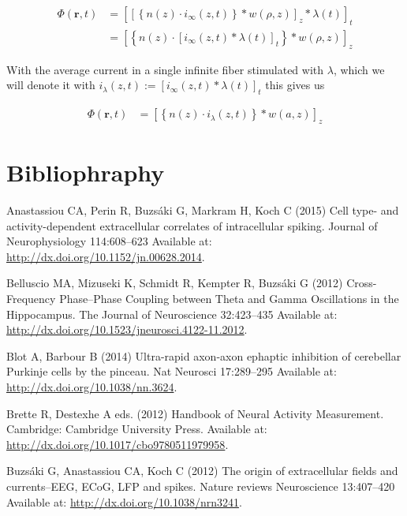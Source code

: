 \documentclass[]{article}
\begin{document}
\begin{align}
  \label{eqn:switchedpot}
  \Phi(\mathbf{r},t) & =  \left[\left[\left\{n(z)\cdot i_{\infty}(z,t)\right\}\ast w(\rho,z)\right]_z \ast \lambda(t)\right]_t \\
  & =  \left[\left\{n(z)\cdot \left[i_{\infty}(z,t)\ast \lambda(t)\right]_t\right\}\ast w(\rho,z)\right]_z
\end{align}

With the average current in a single infinite fiber stimulated with
\(\lambda\), which we will denote it with
\(i_\lambda(z,t) := \left[i_{\infty}(z,t)\ast \lambda(t)\right]_t\) this
gives us

\begin{align}
  \Phi(\mathbf{r},t) & =  \left[\left\{n(z)\cdot i_\lambda(z,t)\right\}\ast w(a,z)\right]_z
  \label{eqn:switchedpotend}
\end{align}

\section*{Bibliophraphy}\label{bibliophraphy}

\hypertarget{refs}{}
\hypertarget{ref-Anastassiou2015Cell}{}
Anastassiou CA, Perin R, Buzsáki G, Markram H, Koch C (2015) Cell type-
and activity-dependent extracellular correlates of intracellular
spiking. Journal of Neurophysiology 114:608--623 Available at:
\url{http://dx.doi.org/10.1152/jn.00628.2014}.

\hypertarget{ref-Belluscio2012CrossFrequency}{}
Belluscio MA, Mizuseki K, Schmidt R, Kempter R, Buzsáki G (2012)
Cross-Frequency Phase--Phase Coupling between Theta and Gamma
Oscillations in the Hippocampus. The Journal of Neuroscience 32:423--435
Available at: \url{http://dx.doi.org/10.1523/jneurosci.4122-11.2012}.

\hypertarget{ref-Blot2014Ultrarapid}{}
Blot A, Barbour B (2014) Ultra-rapid axon-axon ephaptic inhibition of
cerebellar Purkinje cells by the pinceau. Nat Neurosci 17:289--295
Available at: \url{http://dx.doi.org/10.1038/nn.3624}.

\hypertarget{ref-Brette2012Handbook}{}
Brette R, Destexhe A eds. (2012) Handbook of Neural Activity
Measurement. Cambridge: Cambridge University Press. Available at:
\url{http://dx.doi.org/10.1017/cbo9780511979958}.

\hypertarget{ref-Buzsaki2012Origin}{}
Buzsáki G, Anastassiou CA, Koch C (2012) The origin of extracellular
fields and currents--EEG, ECoG, LFP and spikes. Nature reviews
Neuroscience 13:407--420 Available at:
\url{http://dx.doi.org/10.1038/nrn3241}.
\end{document}
